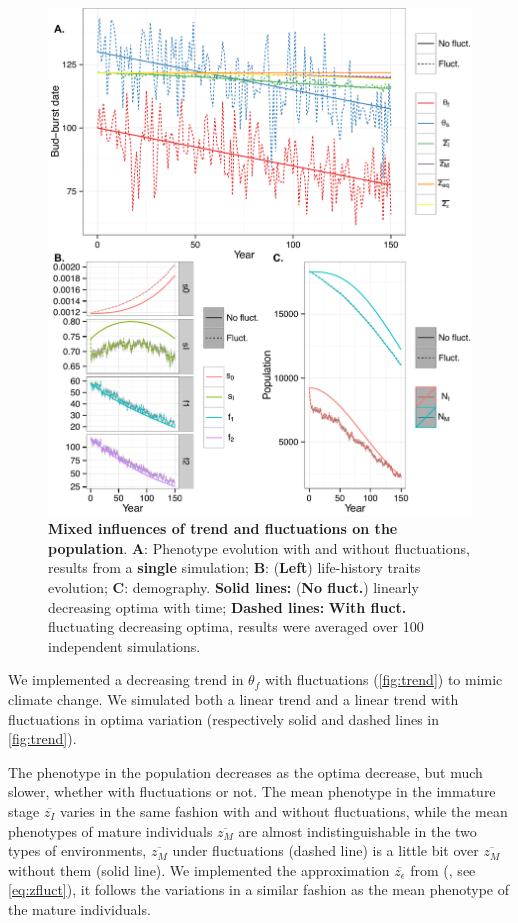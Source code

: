 \begin{figure}[ht!]
	\centering
	\includegraphics[scale=1]{Figures/Trend.pdf}
	\caption{\textbf{Mixed influences of trend and fluctuations on the population}. \textbf{A}: Phenotype evolution with and without fluctuations, results from a \textbf{single} simulation; \textbf{B}: (\textbf{Left}) life-history traits evolution; \textbf{C}: demography. \textbf{Solid lines:} (\textbf{No fluct.}) linearly decreasing optima with time; \textbf{Dashed lines:} \textbf{With fluct.} fluctuating decreasing optima, results were averaged over 100 independent simulations.}
	\label{fig:trend}
\end{figure}

We implemented a decreasing trend in $\theta_f$ with fluctuations (\autoref{fig:trend}) to mimic climate change. We simulated both a linear trend and a linear trend with fluctuations in optima variation (respectively solid and dashed lines in \autoref{fig:trend}).

The phenotype in the population decreases as the optima decrease, but much slower, whether with fluctuations or not. The mean phenotype in the immature stage $\overline{z_I}$ varies in the same fashion with and without fluctuations, while the mean phenotypes of mature individuals $\overline{z_M}$ are almost indistinguishable in the two types of environments, $\overline{z_M}$ under fluctuations (dashed line) is a little bit over $\overline{z_M}$ without them (solid line). We implemented the approximation $\overline{z_\epsilon}$ from (\citealt{engen_evolution_2011}, see \autoref{eq:zfluct}), it follows the variations in a similar fashion as the mean phenotype of the mature individuals.

